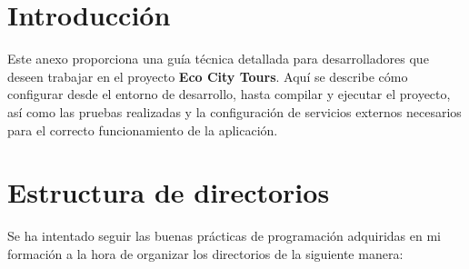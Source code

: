 
\section{Introducción}
Este anexo proporciona una guía técnica detallada para desarrolladores que deseen trabajar en el proyecto \textbf{Eco City Tours}. Aquí se describe cómo configurar desde el entorno de desarrollo, hasta compilar y ejecutar el proyecto, así como las pruebas realizadas y la configuración de servicios externos necesarios para el correcto funcionamiento de la aplicación. 

\section{Estructura de directorios}
Se ha intentado seguir las buenas prácticas de programación adquiridas en mi formación a la hora de organizar los directorios de la siguiente manera:
